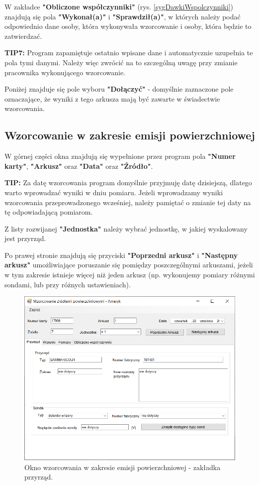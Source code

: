 	W zakładce \textbf{"Obliczone współczynniki"} (rys. \ref{sygDawkiWspolczynniki}) znajdują się pola \textbf{"Wykonał(a)"} i \textbf{"Sprawdził(a)"}, w których należy podać odpowiednio dane osoby, która wykonywała wzorcowanie i osoby, która będzie to zatwierdzać. 
	
	\textbf{TIP7:} Program zapamiętuje ostatnio wpisane dane i automatycznie uzupełnia te pola tymi danymi. Należy więc zwrócić na to szczególną uwagę przy zmianie pracownika wykonującego wzorcowanie.
	
	Poniżej znajduje się pole wyboru \textbf{"Dołączyć"} - domyślnie zaznaczone pole oznaczające, że wyniki z tego arkusza mają być zawarte w świadectwie wzorcowania.

\subsection{Wzorcowanie w zakresie emisji powierzchniowej}
\label{wzorcowanie_emisja}

	W górnej części okna znajdują się wypełnione przez program pola \textbf{"Numer karty"}, \textbf{"Arkusz"} oraz \textbf{"Data"} oraz \textbf{"Źródło"}. 
	
	\textbf{TIP:} Za datę wzorcowania program domyślnie przyjmuję datę dzisiejszą, dlatego warto wprowadzać wyniki w dniu pomiaru. Jeżeli wprowadzamy wyniki wzorcowania przeprowadzonego wcześniej, należy pamiętać o zmianie tej daty na tę odpowiadającą pomiarom.
	
	Z listy rozwijanej \textbf{"Jednostka"} należy wybrać jednostkę, w jakiej wyskalowany jest przyrząd.
	
	Po prawej stronie znajdują się przyciski \textbf{"Poprzedni arkusz"} i \textbf{"Następny arkusz"} umożliwiające poruszanie się pomiędzy poszczególnymi arkuszami, jeżeli w tym zakresie istnieje więcej niż jeden arkusz (np. wykonujemy pomiary różnymi sondami, lub przy różnych ustawieniach).
	
	\begin{figure}[htb]
		\centering
		\includegraphics[width=\columnwidth]{obrazki/Wzorcowanie/emisja/przyrzad.png}
		\caption{Okno wzorcowania w zakresie emisji powierzchniowej - zakładka przyrząd.}
		\label{emisjaPrzyrzad}
	\end{figure}
	
